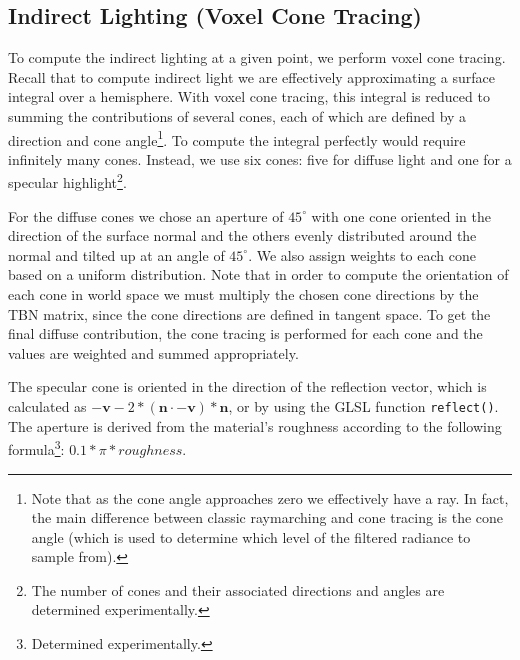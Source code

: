 \subsection{Indirect Lighting (Voxel Cone Tracing)}
To compute the indirect lighting at a given point, we perform voxel cone tracing. Recall that to compute indirect light we are effectively approximating a surface integral over a hemisphere. With voxel cone tracing, this integral is reduced to summing the contributions of several cones, each of which are defined by a direction and cone angle\footnote{Note that as the cone angle approaches zero we effectively have a ray. In fact, the main difference between classic raymarching and cone tracing is the cone angle (which is used to determine which level of the filtered radiance to sample from).}. To compute the integral perfectly would require infinitely many cones. Instead, we use six cones: five for diffuse light and one for a specular highlight\footnote{The number of cones and their associated directions and angles are determined experimentally.}.

For the diffuse cones we chose an aperture of $45^\circ$ with one cone oriented in the direction of the surface normal and the others evenly distributed around the normal and tilted up at an angle of $45^\circ$. We also assign weights to each cone based on a uniform distribution. Note that in order to compute the orientation of each cone in world space we must multiply the chosen cone directions by the TBN matrix, since the cone directions are defined in tangent space. To get the final diffuse contribution, the cone tracing is performed for each cone and the values are weighted and summed appropriately.

The specular cone is oriented in the direction of the reflection vector, which is calculated as $-\bm{v} - 2 * (\bm{n} \cdot -\bm{v}) * \bm{n}$, or by using the GLSL function \texttt{reflect()}. The aperture is derived from the material's roughness according to the following formula\footnote{Determined experimentally.}: $0.1 * \pi * roughness$.


